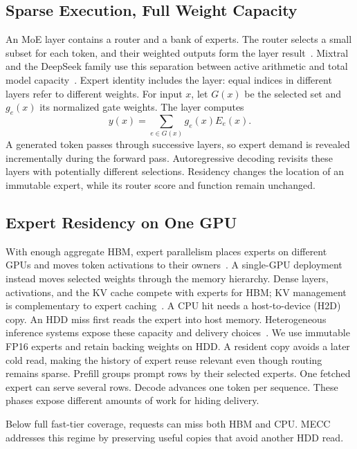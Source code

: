 \documentclass[conference,9pt,letterpaper]{IEEEtran}
\begin{document}
\subsection{Sparse Execution, Full Weight Capacity}
An MoE layer contains a router and a bank of experts. The router selects a small subset for each token, and their weighted outputs form the layer result~\cite{shazeer,switch,gshard}. Mixtral and the DeepSeek family use this separation between active arithmetic and total model capacity~\cite{mixtral,deepseekmoe,deepseekv2,deepseekv3,mixtral22}. Expert identity includes the layer: equal indices in different layers refer to different weights. For input $x$, let $G(x)$ be the selected set and $g_e(x)$ its normalized gate weights. The layer computes
\begin{equation}
y(x)=\sum_{e\in G(x)}g_e(x)E_e(x).
\end{equation}
A generated token passes through successive layers, so expert demand is revealed incrementally during the forward pass. Autoregressive decoding revisits these layers with potentially different selections. Residency changes the location of an immutable expert, while its router score and function remain unchanged.

\subsection{Expert Residency on One GPU}
With enough aggregate HBM, expert parallelism places experts on different GPUs and moves token activations to their owners~\cite{deepspeedmoe,tutel,megablocks,flashmoedist,harmoeny}. A single-GPU deployment instead moves selected weights through the memory hierarchy. Dense layers, activations, and the KV cache compete with experts for HBM; KV management is complementary to expert caching~\cite{pagedattention,sglang}. A CPU hit needs a host-to-device (H2D) copy. An HDD miss first reads the expert into host memory. Heterogeneous inference systems expose these capacity and delivery choices~\cite{flexgen,dsinference,zeroinfinity,llmflash,powerinfer}. We use immutable FP16 experts and retain backing weights on HDD. A resident copy avoids a later cold read, making the history of expert reuse relevant even though routing remains sparse. Prefill groups prompt rows by their selected experts. One fetched expert can serve several rows. Decode advances one token per sequence. These phases expose different amounts of work for hiding delivery.

Below full fast-tier coverage, requests can miss both HBM and CPU. MECC addresses this regime by preserving useful copies that avoid another HDD read.
\end{document}
